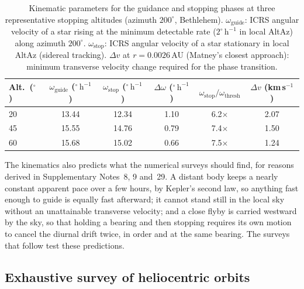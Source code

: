 \documentclass[sn-nature]{sn-jnl}
\begin{document}
\begin{table}[h]
\caption{Kinematic parameters for the guidance and stopping phases at three
representative stopping altitudes (azimuth $200^\circ$, Bethlehem).
$\omega_\mathrm{guide}$: ICRS angular velocity of a star rising at the
minimum detectable rate ($2^\circ\,\mathrm{h}^{-1}$ in local AltAz) along
azimuth $200^\circ$.
$\omega_\mathrm{stop}$: ICRS angular velocity of a star stationary in local
AltAz (sidereal tracking).
$\Delta v$ at $r = 0.0026$\,AU (Matney's closest approach): minimum
transverse velocity change required for the phase transition.}\label{tab:kinematics}
\begin{tabular}{@{}lccccc@{}}
\toprule
Alt.\ ($^\circ$) & $\omega_\mathrm{guide}$ ($^\circ\,\mathrm{h}^{-1}$) &
  $\omega_\mathrm{stop}$ ($^\circ\,\mathrm{h}^{-1}$) &
  $\Delta\omega$ ($^\circ\,\mathrm{h}^{-1}$) &
  $\omega_\mathrm{stop}/\omega_\mathrm{thresh}$ &
  $\Delta v$ (km\,s$^{-1}$) \\
\midrule
20 & 13.44 & 12.34 & 1.10 & 6.2$\times$ & 2.07 \\
45 & 15.55 & 14.76 & 0.79 & 7.4$\times$ & 1.50 \\
60 & 15.68 & 15.02 & 0.66 & 7.5$\times$ & 1.24 \\
\bottomrule
\end{tabular}
\end{table}

The kinematics also predicts what the numerical surveys should find, for
reasons derived in Supplementary Notes~8, 9 and~29. A distant body keeps a nearly
constant apparent pace over a few hours, by Kepler's second law, so anything
fast enough to guide is equally fast afterward; it cannot stand still in the
local sky without an unattainable transverse velocity; and a close flyby is
carried westward by the sky, so that holding a bearing and then stopping
requires its own motion to cancel the diurnal drift twice, in order and at the
same bearing. The surveys that follow test these predictions.

\subsection{Exhaustive survey of heliocentric orbits}
\label{subsec:helio}
\end{document}
